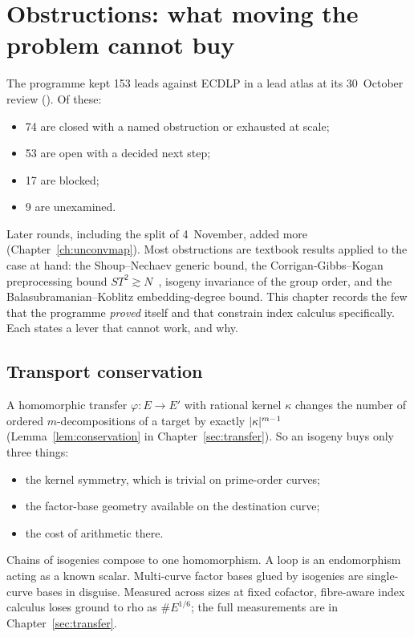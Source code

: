 \chapter{Obstructions: what moving the problem cannot buy}\label{ch:obstructions}

The programme kept 153 leads against ECDLP in a lead atlas at its
30~October review
().
Of these:
\begin{itemize}
\item 74 are closed with a named obstruction or exhausted at scale;
\item 53 are open with a decided next step;
\item 17 are blocked;
\item 9 are unexamined.
\end{itemize}
Later rounds, including the split of 4~November, added more
(Chapter~\ref{ch:unconvmap}).
Most obstructions are textbook results applied to the case at hand: the
Shoup--Nechaev generic bound, the Corrigan-Gibbs--Kogan preprocessing bound
$ST^2\gtrsim N$~\cite{cgk2018}, isogeny invariance of the group order, and
the Balasubramanian--Koblitz embedding-degree bound. This chapter records
the few that the programme \emph{proved} itself and that constrain index
calculus specifically. Each states a lever that cannot work, and why.

\section{Transport conservation}\label{sec:obs-transport}

A homomorphic transfer $\varphi:E\to E'$ with rational kernel $\kappa$
changes the number of ordered $m$-decompositions of a target by exactly
$\lvert \kappa \rvert^{m-1}$ (Lemma~\ref{lem:conservation} in
Chapter~\ref{sec:transfer}). So an isogeny buys only three things:
\begin{itemize}
\item the kernel symmetry, which is trivial on prime-order curves;
\item the factor-base geometry available on the destination curve;
\item the cost of arithmetic there.
\end{itemize}
Chains of isogenies compose to one homomorphism. A loop is an endomorphism
acting as a known scalar. Multi-curve factor bases glued by isogenies are
single-curve bases in disguise. Measured across sizes at fixed cofactor,
fibre-aware index calculus loses ground to rho as $\#E^{1/6}$; the full
measurements are in Chapter~\ref{sec:transfer}.

